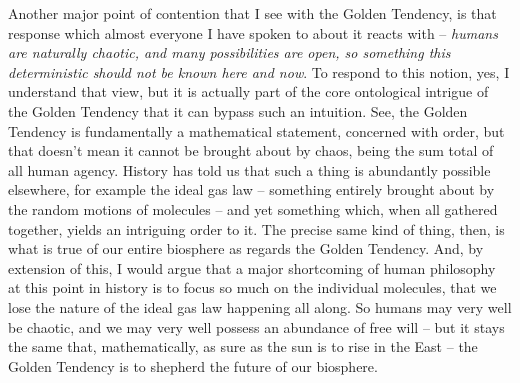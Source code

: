 Another major point of contention that I see with the Golden Tendency, is that response which almost everyone I have spoken to about it reacts with -- \textit{humans are naturally chaotic, and many possibilities are open, so something this deterministic should not be known here and now}. To respond to this notion, yes, I understand that view, but it is actually part of the core ontological intrigue of the Golden Tendency that it can bypass such an intuition. See, the Golden Tendency is fundamentally a mathematical statement, concerned with order, but that doesn't mean it cannot be brought about by chaos, being the sum total of all human agency. History has told us that such a thing is abundantly possible elsewhere, for example the ideal gas law -- something entirely brought about by the random motions of molecules -- and yet something which, when all gathered together, yields an intriguing order to it. The precise same kind of thing, then, is what is true of our entire biosphere as regards the Golden Tendency. And, by extension of this, I would argue that a major shortcoming of human philosophy at this point in history is to focus so much on the individual molecules, that we lose the nature of the ideal gas law happening all along. So humans may very well be chaotic, and we may very well possess an abundance of free will -- but it stays the same that, mathematically, as sure as the sun is to rise in the East -- the Golden Tendency is to shepherd the future of our biosphere. 

